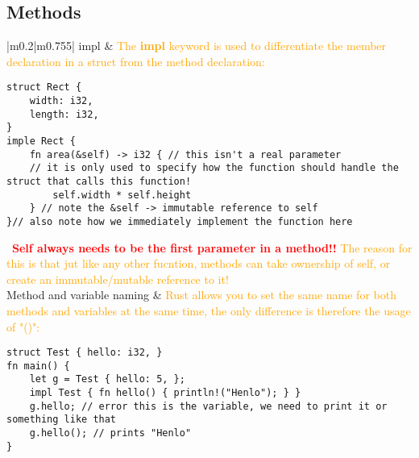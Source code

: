 \documentclass[main.tex,fontsize=8pt,paper=a4,paper=portrait,DIV=calc,]{scrartcl}
\begin{document}
\begin{table}[ht!]
\subsection{Methods}
\begin{tabular}{|m{0.2\linewidth}|m{0.755\linewidth}|}
\hline
impl & 
\textcolor{orange}{The \textbf{impl} keyword is used to differentiate the member declaration in a struct from the method declaration:}\newline
\begin{lstlisting}
struct Rect {
    width: i32,
    length: i32,
}
imple Rect {
    fn area(&self) -> i32 { // this isn't a real parameter
    // it is only used to specify how the function should handle the struct that calls this function!
        self.width * self.height
    } // note the &self -> immutable reference to self
}// also note how we immediately implement the function here
\end{lstlisting}
\, \newline
\textcolor{red}{\textbf{Self always needs to be the first parameter in a method!!}}\newline
\textcolor{orange}{The reason for this is that jut like any other fucntion, methods can take ownership of self, or create an immutable/mutable reference to it!}\\
\hline
Method and variable naming &
\textcolor{orange}{Rust allows you to set the same name for both methods and variables at the same time, the only difference is therefore the usage of "()":}\newline
\begin{lstlisting}
struct Test { hello: i32, }
fn main() {
    let g = Test { hello: 5, };
    impl Test { fn hello() { println!("Henlo"); } }
    g.hello; // error this is the variable, we need to print it or something like that
    g.hello(); // prints "Henlo"
}
\end{lstlisting}\\
\hline
\end{tabular}
\end{table}
\pagebreak
\end{document}
